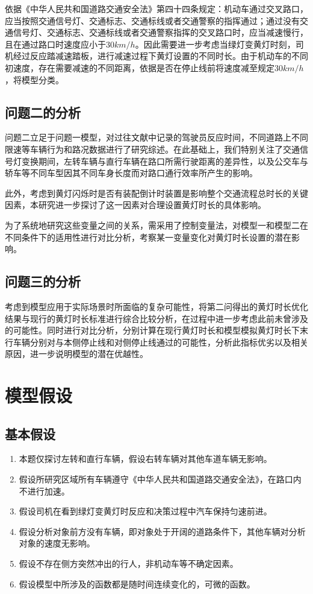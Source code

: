 \documentclass[withoutpreface,bwprint]{cumcmthesis}
\begin{document}
依据《中华人民共和国道路交通安全法》第四十四条规定：机动车通过交叉路口，应当按照交通信号灯、交通标志、交通标线或者交通警察的指挥通过；通过没有交通信号灯、交通标志、交通标线或者交通警察指挥的交叉路口时，应当减速慢行，且在通过路口时速度应小于30$km/h$。因此需要进一步考虑当绿灯变黄灯时刻，司机经过反应踏减速踏板，进行减速过程下黄灯设置的不同时长。由于机动车的不同初速度，存在需要减速的不同距离，依据是否在停止线前将速度减至规定30$km/h$，将模型分类。

\subsection{问题二的分析}
问题二立足于问题一模型，对过往文献中记录的驾驶员反应时间，不同道路上不同限速等车辆行为和路况数据进行了研究综述。在此基础上，我们特别关注了交通信号灯变换期间，左转车辆与直行车辆在路口所需行驶距离的差异性，以及公交车与轿车等不同车型因其不同车身长度而对路口通行效率所产生的影响。

此外，考虑到黄灯闪烁时是否有装配倒计时装置是影响整个交通流程总时长的关键因素，本研究进一步探讨了这一因素对合理设置黄灯时长的具体影响。

为了系统地研究这些变量之间的关系，需采用了控制变量法，对模型一和模型二在不同条件下的适用性进行对比分析，考察某一变量变化对黄灯时长设置的潜在影响。


\subsection{问题三的分析}
考虑到模型应用于实际场景时所面临的复杂可能性，将第二问得出的黄灯时长优化结果与现行的黄灯时长标准进行综合比较分析，在过程中进一步考虑此前未曾涉及的可能性。同时进行对比分析，分别计算在现行黄灯时长和模型模拟黄灯时长下末行车辆分别对与本侧停止线和对侧停止线通过的可能性，分析此指标优劣以及相关原因，进一步说明模型的潜在优越性。
\section{模型假设}
\subsection{基本假设}
\begin{enumerate}
	\item 本题仅探讨左转和直行车辆，假设右转车辆对其他车道车辆无影响。
	\item 假设所研究区域所有车辆遵守《中华人民共和国道路交通安全法》，在路口内不进行加速。
	\item 假设司机在看到绿灯变黄灯时反应和决策过程中汽车保持匀速前进。
	\item 假设分析对象前方没有车辆，即对象处于开阔的道路条件下，其他车辆对分析对象的速度无影响。
	\item 假设不存在侧方突然冲出的行人，非机动车等不确定因素。
	\item 假设模型中所涉及的函数都是随时间连续变化的，可微的函数。
\end{enumerate}
\end{document}
